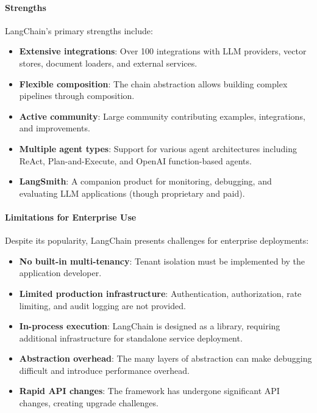 \documentclass[a4paper,twoside]{sapthesis}
\begin{document}
\paragraph{Strengths}
LangChain's primary strengths include:
\begin{itemize}
    \item \textbf{Extensive integrations}: Over 100 integrations with LLM providers, vector stores, document loaders, and external services.
    \item \textbf{Flexible composition}: The chain abstraction allows building complex pipelines through composition.
    \item \textbf{Active community}: Large community contributing examples, integrations, and improvements.
    \item \textbf{Multiple agent types}: Support for various agent architectures including ReAct, Plan-and-Execute, and OpenAI function-based agents.
    \item \textbf{LangSmith}: A companion product for monitoring, debugging, and evaluating LLM applications (though proprietary and paid).
\end{itemize}

\paragraph{Limitations for Enterprise Use}
Despite its popularity, LangChain presents challenges for enterprise deployments:
\begin{itemize}
    \item \textbf{No built-in multi-tenancy}: Tenant isolation must be implemented by the application developer.
    \item \textbf{Limited production infrastructure}: Authentication, authorization, rate limiting, and audit logging are not provided.
    \item \textbf{In-process execution}: LangChain is designed as a library, requiring additional infrastructure for standalone service deployment.
    \item \textbf{Abstraction overhead}: The many layers of abstraction can make debugging difficult and introduce performance overhead.
    \item \textbf{Rapid API changes}: The framework has undergone significant API changes, creating upgrade challenges.
\end{itemize}
\end{document}
